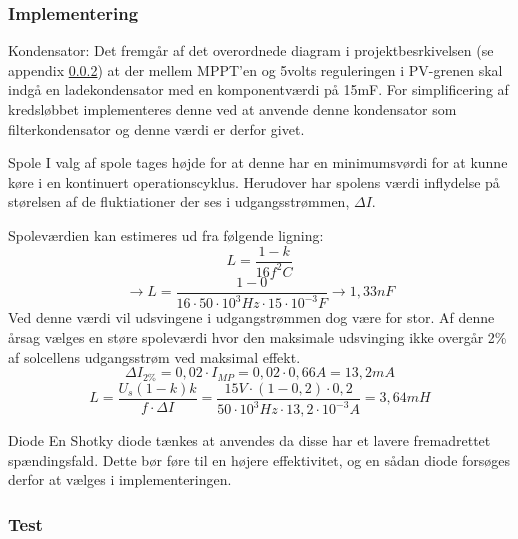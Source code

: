 \documentclass[../main.tex]{subfiles}
\begin{document}
        \subsubsection{Implementering}

            Kondensator:
            Det fremgår af det overordnede diagram i projektbesrkivelsen (se appendix \ref{}) at der mellem MPPT'en og 5volts reguleringen i PV-grenen skal indgå en ladekondensator med en komponentværdi på 15mF. For simplificering af kredsløbbet implementeres denne ved at anvende denne kondensator som filterkondensator og denne værdi er derfor givet.
            
            Spole
            I valg af spole tages højde for at denne har en minimumsvørdi for at kunne køre i en kontinuert operationscyklus. Herudover har spolens værdi inflydelse på størelsen af de fluktiationer der ses i udgangsstrømmen, $\Delta I$.\newline

            Spoleværdien kan estimeres ud fra følgende ligning:
            $$L = \frac{1-k}{16 f^2 C}$$
            $$\rightarrow L = \frac{1-0}{16\cdot 50\cdot 10^3 Hz \cdot 15\cdot 10^{-3}F} \rightarrow 1,33nF$$
            \newline
            Ved denne værdi vil udsvingene i udgangstrømmen dog være for stor. Af denne årsag vælges en støre spoleværdi hvor den maksimale udsvinging ikke overgår 2\% af solcellens udgangsstrøm ved maksimal effekt.
            $$\Delta I_{2\%} = 0,02 \cdot I_{MP} = 0,02 \cdot 0,66A = 13,2mA$$
            $$L = \frac{U_s(1-k)k}{f\cdot \Delta I} = \frac{15 V\cdot (1-0,2)\cdot 0,2}{50\cdot 10^3 Hz \cdot 13,2 \cdot 10^{-3} A} = 3,64mH$$\newline
            
            
            Diode
            En Shotky diode tænkes at anvendes da disse har et lavere fremadrettet spændingsfald. Dette bør føre til en højere effektivitet, og en sådan diode forsøges derfor at vælges i implementeringen.
            
            
        \subsubsection{Test}
        
\end{document}
